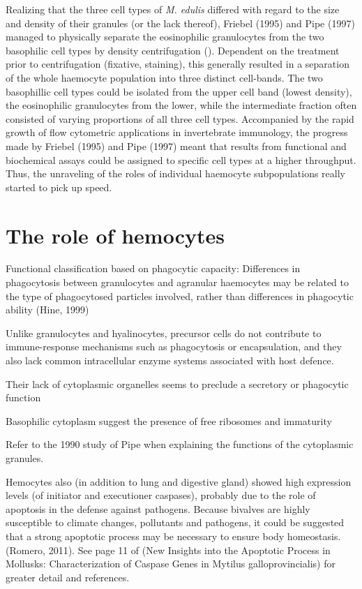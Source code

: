 Realizing that the three cell types of \emph{M. edulis} differed with regard to the size and density of their granules (or the lack thereof), Friebel (1995) and Pipe (1997) managed to physically separate the eosinophilic granulocytes from the two basophilic cell types by density centrifugation (\cite{Friebel1995, Pipe1997}). Dependent on the treatment prior to centrifugation (fixative, staining), this generally resulted in a separation of the whole haemocyte population into three distinct cell-bands. The two basophillic cell types could be isolated from the upper cell band (lowest density), the eosinophilic granulocytes from the lower, while the intermediate fraction often consisted of varying proportions of all three cell types. Accompanied by the rapid growth of flow cytometric applications in invertebrate immunology, the progress made by Friebel (1995) and Pipe (1997) meant that results from functional and biochemical assays could be assigned to specific cell types at a higher throughput. Thus, the unraveling of the roles of individual haemocyte subpopulations really started to pick up speed.

\section{The role of hemocytes}
Functional classification based on phagocytic capacity: Differences in phagocytosis between granulocytes and agranular haemocytes may be related to the type of phagocytosed particles involved, rather than differences in phagocytic ability (Hine, 1999)


Unlike granulocytes and hyalinocytes, precursor cells do not contribute to immune-response mechanisms such as phagocytosis or encapsulation, and they also lack common intracellular enzyme systems associated with host defence. 

Their lack of cytoplasmic organelles seems to preclude a secretory or phagocytic function

Basophilic cytoplasm suggest the presence of free ribosomes and immaturity

Refer to the 1990 study of Pipe when explaining the functions of the cytoplasmic granules.


Hemocytes also (in addition to lung and digestive gland) showed high expression levels (of initiator and executioner caspases), probably due to the role of apoptosis in the defense against pathogens. Because bivalves are highly susceptible to climate changes, pollutants and pathogens, it  could be suggested that a strong apoptotic process may be necessary to ensure body homeostasis. (Romero, 2011). See page 11 of (New Insights into the Apoptotic Process in Mollusks: Characterization of Caspase Genes in Mytilus galloprovincialis) for greater detail and references.

